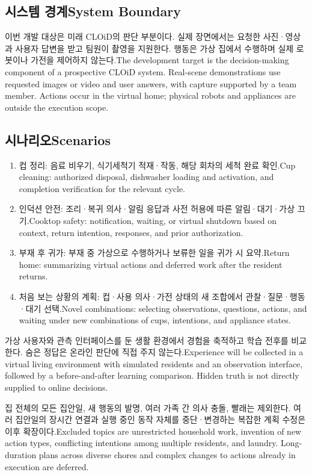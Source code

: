 \documentclass[conference,a4paper]{IEEEtran}
\newcommand{\bi}[2]{\ifKorean#1\else#2\fi}
\begin{document}
\subsection{\bi{시스템 경계}{System Boundary}}
\bi{이번 개발 대상은 미래 CLOiD의 판단 부분이다. 실제 장면에서는 요청한 사진·영상과 사용자 답변을 받고 팀원이 촬영을 지원한다. 행동은 가상 집에서 수행하며 실제 로봇이나 가전을 제어하지 않는다.}{The development target is the decision-making component of a prospective CLOiD system. Real-scene demonstrations use requested images or video and user answers, with capture supported by a team member. Actions occur in the virtual home; physical robots and appliances are outside the execution scope.}
\subsection{\bi{시나리오}{Scenarios}}
\begin{enumerate}
\item \bi{컵 정리: 음료 비우기, 식기세척기 적재·작동, 해당 회차의 세척 완료 확인.}{Cup cleaning: authorized disposal, dishwasher loading and activation, and completion verification for the relevant cycle.}
\item \bi{인덕션 안전: 조리·복귀 의사·알림 응답과 사전 허용에 따른 알림·대기·가상 끄기.}{Cooktop safety: notification, waiting, or virtual shutdown based on context, return intention, responses, and prior authorization.}
\item \bi{부재 후 귀가: 부재 중 가상으로 수행하거나 보류한 일을 귀가 시 요약.}{Return home: summarizing virtual actions and deferred work after the resident returns.}
\item \bi{처음 보는 상황의 계획: 컵·사용 의사·가전 상태의 새 조합에서 관찰·질문·행동·대기 선택.}{Novel combinations: selecting observations, questions, actions, and waiting under new combinations of cups, intentions, and appliance states.}
\end{enumerate}
\bi{가상 사용자와 관측 인터페이스를 둔 생활 환경에서 경험을 축적하고 학습 전후를 비교한다. 숨은 정답은 온라인 판단에 직접 주지 않는다.}{Experience will be collected in a virtual living environment with simulated residents and an observation interface, followed by a before-and-after learning comparison. Hidden truth is not directly supplied to online decisions.}

\bi{집 전체의 모든 집안일, 새 행동의 발명, 여러 가족 간 의사 충돌, 빨래는 제외한다. 여러 집안일의 장시간 연결과 실행 중인 동작 자체를 중단·변경하는 복잡한 계획 수정은 이후 확장이다.}{Excluded topics are unrestricted household work, invention of new action types, conflicting intentions among multiple residents, and laundry. Long-duration plans across diverse chores and complex changes to actions already in execution are deferred.}
\end{document}
